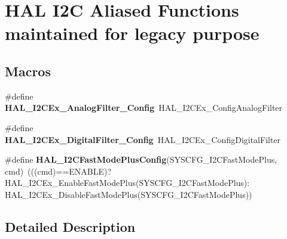 \hypertarget{group___h_a_l___i2_c___aliased___functions}{}\section{H\+AL I2C Aliased Functions maintained for legacy purpose}
\label{group___h_a_l___i2_c___aliased___functions}
\subsection*{Macros}
\begin{DoxyCompactItemize}
\item 
\#define {\bfseries H\+A\+L\+\_\+\+I2\+C\+Ex\+\_\+\+Analog\+Filter\+\_\+\+Config}~H\+A\+L\+\_\+\+I2\+C\+Ex\+\_\+\+Config\+Analog\+Filter\hypertarget{group___h_a_l___i2_c___aliased___functions_ga29a6d7298eb9b8290229e37a6eee9c21}{}\label{group___h_a_l___i2_c___aliased___functions_ga29a6d7298eb9b8290229e37a6eee9c21}

\item 
\#define {\bfseries H\+A\+L\+\_\+\+I2\+C\+Ex\+\_\+\+Digital\+Filter\+\_\+\+Config}~H\+A\+L\+\_\+\+I2\+C\+Ex\+\_\+\+Config\+Digital\+Filter\hypertarget{group___h_a_l___i2_c___aliased___functions_gad145cb83d816a71f5f8085e5abb9cf8a}{}\label{group___h_a_l___i2_c___aliased___functions_gad145cb83d816a71f5f8085e5abb9cf8a}

\item 
\#define {\bfseries H\+A\+L\+\_\+\+I2\+C\+Fast\+Mode\+Plus\+Config}(S\+Y\+S\+C\+F\+G\+\_\+\+I2\+C\+Fast\+Mode\+Plus,  cmd)~(((cmd)==E\+N\+A\+B\+LE)? H\+A\+L\+\_\+\+I2\+C\+Ex\+\_\+\+Enable\+Fast\+Mode\+Plus(S\+Y\+S\+C\+F\+G\+\_\+\+I2\+C\+Fast\+Mode\+Plus)\+: H\+A\+L\+\_\+\+I2\+C\+Ex\+\_\+\+Disable\+Fast\+Mode\+Plus(S\+Y\+S\+C\+F\+G\+\_\+\+I2\+C\+Fast\+Mode\+Plus))\hypertarget{group___h_a_l___i2_c___aliased___functions_ga340e0d97db96b108c18718d4b37bdb29}{}\label{group___h_a_l___i2_c___aliased___functions_ga340e0d97db96b108c18718d4b37bdb29}

\end{DoxyCompactItemize}


\subsection{Detailed Description}

